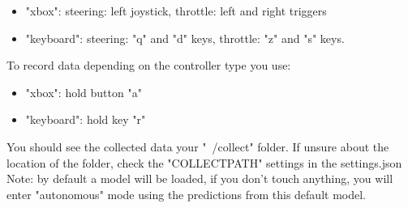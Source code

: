 \documentclass[12pt]{article}
\begin{document}
\begin{itemize}
    \item "xbox": steering: left joystick, throttle: left and right triggers
    \item "keyboard": steering: "q" and "d" keys, throttle: "z" and "s" keys.
\end{itemize}

To record data depending on the controller type you use:\\

\begin{itemize}
    \item "xbox": hold button "a"
    \item "keyboard": hold key "r"
\end{itemize}

    
You should see the collected data your "~/collect" folder. If unsure about the location of the folder, check the "COLLECT\textunderscore PATH" settings in the settings.json\\

Note: by default a model will be loaded, if you don't touch anything, you will enter "autonomous" mode using the predictions from this default model.\\
\end{document}
